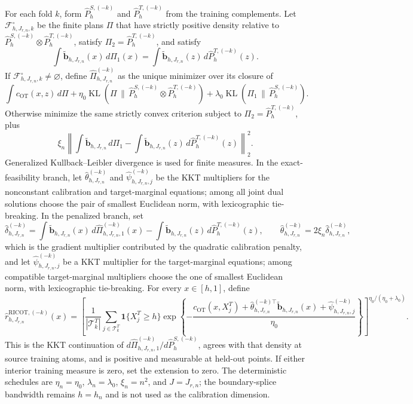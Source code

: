 For each fold \(k\), form \(\widehat P^{S,(-k)}_h\) and \(\widehat P^{T,(-k)}_h\) from the training complements. Let \(\mathcal F^\circ_{h,J_{r,n},k}\) be the finite plans \(\Pi\) that have strictly positive density relative to \(\widehat P^{S,(-k)}_h\otimes\widehat P^{T,(-k)}_h\), satisfy \(\Pi_2=\widehat P^{T,(-k)}_h\), and satisfy
\[
\int\widetilde{\mathbf b}_{h,J_{r,n}}(x)\,d\Pi_1(x)=\int\widetilde{\mathbf b}_{h,J_{r,n}}(z)\,d\widehat P^{T,(-k)}_h(z).
\]
If \(\mathcal F^\circ_{h,J_{r,n},k}\ne\varnothing\), define \(\widehat\Pi^{(-k)}_{h,J_{r,n}}\) as the unique minimizer over its closure of
\[
\int c_{\mathrm{OT}}(x,z)\,d\Pi+\eta_0\operatorname{KL}(\Pi\,\|\,\widehat P^{S,(-k)}_h\otimes\widehat P^{T,(-k)}_h)+\lambda_0\operatorname{KL}(\Pi_1\,\|\,\widehat P^{S,(-k)}_h).
\]
Otherwise minimize the same strictly convex criterion subject to \(\Pi_2=\widehat P^{T,(-k)}_h\), plus
\[
\xi_n\left\|\int\widetilde{\mathbf b}_{h,J_{r,n}}\,d\Pi_1-\int\widetilde{\mathbf b}_{h,J_{r,n}}(z)\,d\widehat P^{T,(-k)}_h(z)\right\|_2^2.
\]
Generalized Kullback--Leibler divergence is used for finite measures. In the exact-feasibility branch, let \(\widehat\theta^{(-k)}_{h,J_{r,n}}\) and \(\widehat\psi^{(-k)}_{h,J_{r,n},j}\) be the KKT multipliers for the nonconstant calibration and target-marginal equations; among all joint dual solutions choose the pair of smallest Euclidean norm, with lexicographic tie-breaking. In the penalized branch, set
\[
\widehat\delta^{(-k)}_{h,J_{r,n}}=
\int\widetilde{\mathbf b}_{h,J_{r,n}}(x)\,d\widehat\Pi^{(-k)}_{h,J_{r,n},1}(x)
-\int\widetilde{\mathbf b}_{h,J_{r,n}}(z)\,d\widehat P^{T,(-k)}_h(z),
\qquad
\widehat\theta^{(-k)}_{h,J_{r,n}}=2\xi_n\widehat\delta^{(-k)}_{h,J_{r,n}},
\]
which is the gradient multiplier contributed by the quadratic calibration penalty, and let \(\widehat\psi^{(-k)}_{h,J_{r,n},j}\) be a KKT multiplier for the target-marginal equations; among compatible target-marginal multipliers choose the one of smallest Euclidean norm, with lexicographic tie-breaking. For every \(x\in[h,1]\), define
\[
\widehat r^{\mathrm{RICOT},(-k)}_{h,J_{r,n}}(x)=\left[\frac1{|\mathcal T^T_k|}\sum_{j\in\mathcal T^T_k}\mathbf 1\{X_j^T\ge h\}\exp\left\{-\frac{c_{\mathrm{OT}}(x,X_j^T)+\widehat\theta_{h,J_{r,n}}^{(-k)\top}\widetilde{\mathbf b}_{h,J_{r,n}}(x)+\widehat\psi^{(-k)}_{h,J_{r,n},j}}{\eta_0}\right\}\right]^{\eta_0/(\eta_0+\lambda_0)}.
\]
This is the KKT continuation of \(d\widehat\Pi^{(-k)}_{h,J_{r,n},1}/d\widehat P^{S,(-k)}_h\), agrees with that density at source training atoms, and is positive and measurable at held-out points. If either interior training measure is zero, set the extension to zero. The deterministic schedules are \(\eta_n=\eta_0\), \(\lambda_n=\lambda_0\), \(\xi_n=n^2\), and \(J=J_{r,n}\); the boundary-splice bandwidth remains \(h=h_n\) and is not used as the calibration dimension.